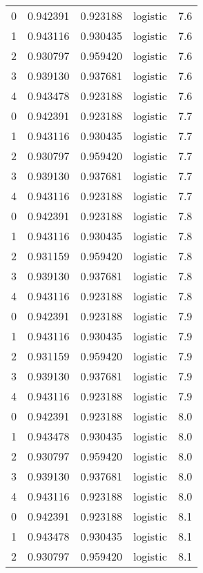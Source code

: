 \begin{tabular}{rrrlr}
     0 & 0.942391 & 0.923188 & logistic &        7.6 \\
     1 & 0.943116 & 0.930435 & logistic &        7.6 \\
     2 & 0.930797 & 0.959420 & logistic &        7.6 \\
     3 & 0.939130 & 0.937681 & logistic &        7.6 \\
     4 & 0.943478 & 0.923188 & logistic &        7.6 \\
     0 & 0.942391 & 0.923188 & logistic &        7.7 \\
     1 & 0.943116 & 0.930435 & logistic &        7.7 \\
     2 & 0.930797 & 0.959420 & logistic &        7.7 \\
     3 & 0.939130 & 0.937681 & logistic &        7.7 \\
     4 & 0.943116 & 0.923188 & logistic &        7.7 \\
     0 & 0.942391 & 0.923188 & logistic &        7.8 \\
     1 & 0.943116 & 0.930435 & logistic &        7.8 \\
     2 & 0.931159 & 0.959420 & logistic &        7.8 \\
     3 & 0.939130 & 0.937681 & logistic &        7.8 \\
     4 & 0.943116 & 0.923188 & logistic &        7.8 \\
     0 & 0.942391 & 0.923188 & logistic &        7.9 \\
     1 & 0.943116 & 0.930435 & logistic &        7.9 \\
     2 & 0.931159 & 0.959420 & logistic &        7.9 \\
     3 & 0.939130 & 0.937681 & logistic &        7.9 \\
     4 & 0.943116 & 0.923188 & logistic &        7.9 \\
     0 & 0.942391 & 0.923188 & logistic &        8.0 \\
     1 & 0.943478 & 0.930435 & logistic &        8.0 \\
     2 & 0.930797 & 0.959420 & logistic &        8.0 \\
     3 & 0.939130 & 0.937681 & logistic &        8.0 \\
     4 & 0.943116 & 0.923188 & logistic &        8.0 \\
     0 & 0.942391 & 0.923188 & logistic &        8.1 \\
     1 & 0.943478 & 0.930435 & logistic &        8.1 \\
     2 & 0.930797 & 0.959420 & logistic &        8.1 \\

\end{tabular}
